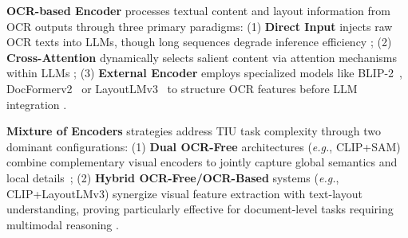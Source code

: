 
\noindent \textbf{OCR-based Encoder} processes textual content and layout information from OCR outputs through three primary paradigms:
(1) \textbf{Direct Input} injects raw OCR texts into LLMs, though long sequences degrade inference efficiency \cite{he2023icl};
(2) \textbf{Cross-Attention} dynamically selects salient content via attention mechanisms within LLMs \cite{Wang2023ARXIV_DocLLM_A_layout};
(3) \textbf{External Encoder} employs specialized models like BLIP-2~\cite{li2023blip2bootstrappinglanguageimagepretraining}, DocFormerv2~\cite{nacson2024docvlmmakevlmefficient} or LayoutLMv3~\cite{Yupan2022ARXIV_LayoutLMv3_Pre_training} to structure OCR features before LLM integration \cite{ Tanaka2024AAAI_InstructDoc_A_Dataset, Luo2024CVPR_LayoutLLM_Layout_Instruction, Fujitake2024LREC_LayoutLLM_Large_Language}.

\noindent \textbf{Mixture of Encoders} strategies address TIU task complexity through two dominant configurations:
(1) \textbf{Dual OCR-Free} architectures (\emph{e.g.}, CLIP+SAM) combine complementary visual encoders to jointly capture global semantics and local details~\cite{wei2024vary};
(2) \textbf{Hybrid OCR-Free/OCR-Based} systems (\emph{e.g.}, CLIP+LayoutLMv3) synergize visual feature extraction with text-layout understanding, proving particularly effective for document-level tasks requiring multimodal reasoning \cite{Liao2024ARXIV_DocLayLLM_An_Efficient}.

